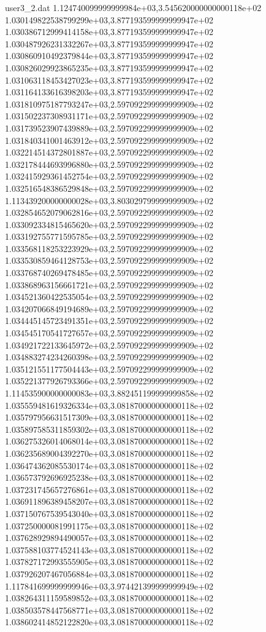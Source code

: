 \begin{filecontents}{user3_2.dat}
1.124740099999999984e+03,3.545620000000000118e+02
1.030149822538799299e+03,3.877193599999999947e+02
1.030386712999414158e+03,3.877193599999999947e+02
1.030487926231332267e+03,3.877193599999999947e+02
1.030860910492379844e+03,3.877193599999999947e+02
1.030826029923865235e+03,3.877193599999999947e+02
1.031063118453427023e+03,3.877193599999999947e+02
1.031164133616398203e+03,3.877193599999999947e+02
1.031810975187793247e+03,2.597092299999999909e+02
1.031502237308931171e+03,2.597092299999999909e+02
1.031739523907439889e+03,2.597092299999999909e+02
1.031840341001463912e+03,2.597092299999999909e+02
1.032214514372801887e+03,2.597092299999999909e+02
1.032178444693996880e+03,2.597092299999999909e+02
1.032415929361452754e+03,2.597092299999999909e+02
1.032516548386529848e+03,2.597092299999999909e+02
1.113439200000000028e+03,3.803029799999999909e+02
1.032854652079062816e+03,2.597092299999999909e+02
1.033092334815465620e+03,2.597092299999999909e+02
1.033192755771595785e+03,2.597092299999999909e+02
1.033568118253223929e+03,2.597092299999999909e+02
1.033530859464128753e+03,2.597092299999999909e+02
1.033768740269478485e+03,2.597092299999999909e+02
1.033868963156661721e+03,2.597092299999999909e+02
1.034521360422535054e+03,2.597092299999999909e+02
1.034207066849194689e+03,2.597092299999999909e+02
1.034445145723491351e+03,2.597092299999999909e+02
1.034545170541727657e+03,2.597092299999999909e+02
1.034921722133645972e+03,2.597092299999999909e+02
1.034883274234260398e+03,2.597092299999999909e+02
1.035121551177504443e+03,2.597092299999999909e+02
1.035221377926793366e+03,2.597092299999999909e+02
1.114535900000000083e+03,3.882451199999999858e+02
1.035559481619326334e+03,3.081870000000000118e+02
1.035797956631517309e+03,3.081870000000000118e+02
1.035897585311859302e+03,3.081870000000000118e+02
1.036275326014068014e+03,3.081870000000000118e+02
1.036235689004392270e+03,3.081870000000000118e+02
1.036474362085530174e+03,3.081870000000000118e+02
1.036573792696925238e+03,3.081870000000000118e+02
1.037231745657276861e+03,3.081870000000000118e+02
1.036911896389458207e+03,3.081870000000000118e+02
1.037150767539543040e+03,3.081870000000000118e+02
1.037250000081991175e+03,3.081870000000000118e+02
1.037628929894490057e+03,3.081870000000000118e+02
1.037588103774524143e+03,3.081870000000000118e+02
1.037827172993555905e+03,3.081870000000000118e+02
1.037926207467056884e+03,3.081870000000000118e+02
1.117841699999999946e+03,3.974421399999999949e+02
1.038264311159589852e+03,3.081870000000000118e+02
1.038503578447568771e+03,3.081870000000000118e+02
1.038602414852122820e+03,3.081870000000000118e+02

\end{filecontents}
